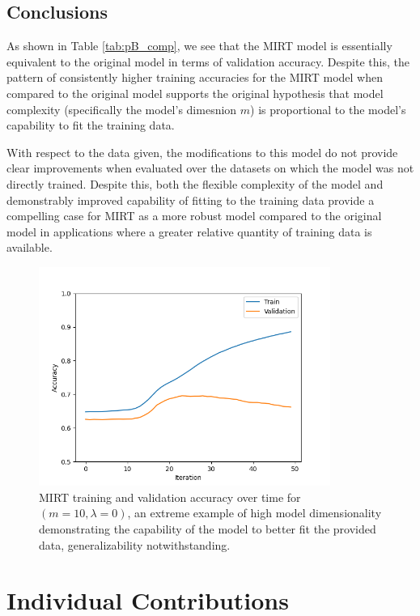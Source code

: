 \documentclass[10pt]{article}
\begin{document}
\subsection*{Conclusions}

As shown in Table \ref{tab:pB_comp}, we see that the MIRT model is essentially equivalent to the original model in terms of validation accuracy. Despite this, the pattern of consistently higher training accuracies for the MIRT model when compared to the original model supports the original hypothesis that model complexity (specifically the model's dimesnion $m$) is proportional to the model's capability to fit the training data.

\spacer

With respect to the data given, the modifications to this model do not provide clear improvements when evaluated over the datasets on which the model was not directly trained. Despite this, both the flexible complexity of the model and demonstrably improved capability of fitting to the training data provide a compelling case for MIRT as a more robust model compared to the original model in applications where a greater relative quantity of training data is available. 

\begin{figure}[H]
    \centering
    \includegraphics[width=0.85\textwidth]{final/partb_2.png}
    \caption{MIRT training and validation accuracy over time for $(m=10,\lambda=0)$, an extreme example of high model dimensionality demonstrating the capability of the model to better fit the provided data, generalizability notwithstanding.}
    \label{fig:pB_accplot2}
\end{figure}

\section*{Individual Contributions}
\end{document}
